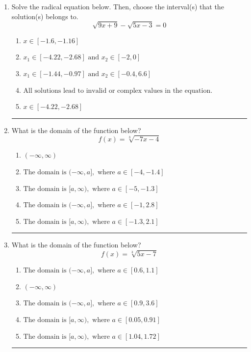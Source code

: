 \documentclass[14pt]{extbook}
\newcommand{\litem}[1]{\item#1\hspace*{-1cm}\rule{\textwidth}{0.4pt}}
\begin{document}
\begin{enumerate}
{\begin{enumerate}[label=\Alph*.]
\end{enumerate} }
\litem{
Solve the radical equation below. Then, choose the interval(s) that the solution(s) belongs to.\[ \sqrt{9 x + 9} - \sqrt{5 x - 3} = 0 \]\begin{enumerate}[label=\Alph*.]
\item \( x \in [-1.6,-1.16] \)
\item \( x_1 \in [-4.22, -2.68] \text{ and } x_2 \in [-2,0] \)
\item \( x_1 \in [-1.44, -0.97] \text{ and } x_2 \in [-0.4,6.6] \)
\item \( \text{All solutions lead to invalid or complex values in the equation.} \)
\item \( x \in [-4.22,-2.68] \)

\end{enumerate} }
\litem{
What is the domain of the function below?\[ f(x) = \sqrt[3]{-7 x - 4} \]\begin{enumerate}[label=\Alph*.]
\item \( (-\infty, \infty) \)
\item \( \text{The domain is } (-\infty, a], \text{   where } a \in [-4, -1.4] \)
\item \( \text{The domain is } [a, \infty), \text{   where } a \in [-5, -1.3] \)
\item \( \text{The domain is } (-\infty, a], \text{   where } a \in [-1, 2.8] \)
\item \( \text{The domain is } [a, \infty), \text{   where } a \in [-1.3, 2.1] \)

\end{enumerate} }
\litem{
What is the domain of the function below?\[ f(x) = \sqrt[3]{5 x - 7} \]\begin{enumerate}[label=\Alph*.]
\item \( \text{The domain is } (-\infty, a], \text{   where } a \in [0.6, 1.1] \)
\item \( (-\infty, \infty) \)
\item \( \text{The domain is } (-\infty, a], \text{   where } a \in [0.9, 3.6] \)
\item \( \text{The domain is } [a, \infty), \text{   where } a \in [0.05, 0.91] \)
\item \( \text{The domain is } [a, \infty), \text{   where } a \in [1.04, 1.72] \)


\end{enumerate}}
\end{enumerate}
\end{document}
